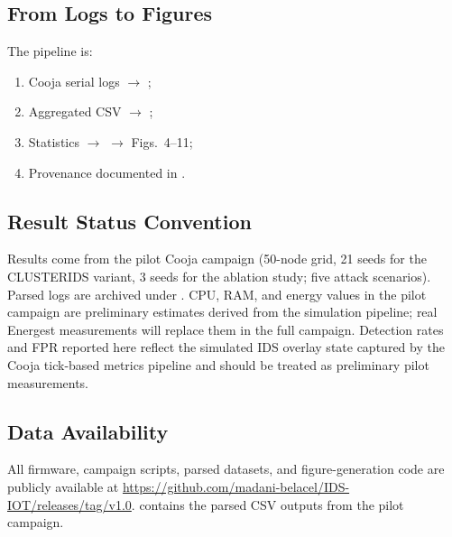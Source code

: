 \subsection{From Logs to Figures}
The pipeline is:
\begin{enumerate}
  \item Cooja serial logs $\rightarrow$ ;
  \item Aggregated CSV $\rightarrow$ ;
  \item Statistics $\rightarrow$  $\rightarrow$ Figs.~4--11;
  \item Provenance documented in .
\end{enumerate}

\subsection{Result Status Convention}
Results come from the pilot Cooja campaign (50-node grid, 21 seeds for the CLUSTERIDS variant, 3 seeds for the ablation study; five attack scenarios).
Parsed logs are archived under . CPU, RAM, and energy values in the pilot campaign are preliminary estimates derived from the simulation pipeline; real Energest measurements will replace them in the full campaign. Detection rates and FPR reported here reflect the simulated IDS overlay state captured by the Cooja tick-based metrics pipeline and should be treated as preliminary pilot measurements.

\subsection{Data Availability}
All firmware, campaign scripts, parsed datasets, and figure-generation code are publicly available at \url{https://github.com/madani-belacel/IDS-IOT/releases/tag/v1.0}.
 contains the parsed CSV outputs from the pilot campaign.
